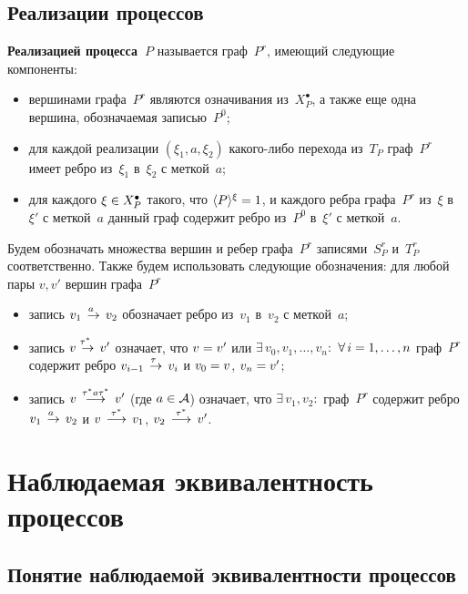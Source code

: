 \begin{multicols}{2}
\subsection{Реализации процессов} %

{\bf Реализацией процесса~$P$} называется граф~$P^r$, имеющий следующие компоненты:
\begin{itemize}
\item вершинами графа~$P^r$ являются означивания из~$X_P^\bullet$, а также еще одна
вершина, обо\-зна\-ча\-емая записью~$P^{0}$;
\item для  каждой реализации $(\xi_1, a, \xi_2)$ ка\-ко\-го-ли\-бо перехода из~$T_P$
граф~$P^r$ имеет ребро из~$\xi_1$ в~$\xi_2$ с меткой~$a$;
\item для каждого  $\xi \hm\in X_P^\bullet$ такого, что
$\langle{P}\rangle^{\xi} \hm= 1$, и каж\-до\-го ребра  графа~$P^r$
из~$\xi$ в~$\xi'$ с меткой~$a$ данный  граф содержит ребро из~$P^0$
в~$\xi'$ с меткой~$a$.
\end{itemize}

Будем обозначать множества вершин  и ребер графа~$P^r$
записями~$S_{P}^r$  и~$T_{P}^r$ соответственно.
Также будем использовать следующие обозначения:
для любой пары $v, v'$ вершин графа~$P^r$
\begin{itemize}
\item запись $v_1\;\mathop{\to}\limits^{\!\!\!a}\; v_2$ обозначает ребро из~$v_1$ в~$v_2$ с меткой~$a$;
\item запись $v\;\mathop{\to}\limits^{\!\!\!\tau^*}\; v'$ означает, что $v\hm=v'$ или
$\exists\,v_0, v_1, \ldots, v_n:$ $\forall\,i\hm=1,\ldots, n$
граф~$P^r$ содержит ребро $v_{i-1}\;\mathop{\to}\limits^{\!\!\!\tau}\;v_i$ и
$v_0 \hm= v$, $v_n \hm= v'$;
\item запись $v\;\mathop{\longrightarrow}\limits^{\tau^*a\tau^*}\; v'$ (где $a\hm\in {\cal A}$)
означает, что $\exists\,v_1, v_2:$ граф~$P^r$  содержит ребро $v_1\;\mathop{\to}\limits^{\!\!\!a}\;v_2$
и $v\;\mathop{\longrightarrow}\limits^{\tau^*}\; v_1$, $v_2\;\mathop{\longrightarrow}\limits^{\tau^*}\; v'$.
\end{itemize}

\section{Наблюдаемая эквивалентность процессов}

\subsection{Понятие наблюдаемой эквивалентности процессов} %


\end{multicols}
